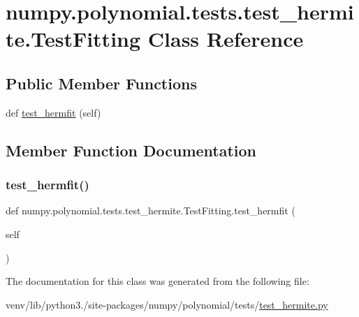 \hypertarget{classnumpy_1_1polynomial_1_1tests_1_1test__hermite_1_1TestFitting}{}\section{numpy.\+polynomial.\+tests.\+test\+\_\+hermite.\+Test\+Fitting Class Reference}
\label{classnumpy_1_1polynomial_1_1tests_1_1test__hermite_1_1TestFitting}
\subsection*{Public Member Functions}
\begin{DoxyCompactItemize}
\item 
def \hyperlink{classnumpy_1_1polynomial_1_1tests_1_1test__hermite_1_1TestFitting_a1f2b53111b48050c3ac6d70d0b3bd99f}{test\+\_\+hermfit} (self)
\end{DoxyCompactItemize}


\subsection{Member Function Documentation}
\mbox{\label{classnumpy_1_1polynomial_1_1tests_1_1test__hermite_1_1TestFitting_a1f2b53111b48050c3ac6d70d0b3bd99f}} 
\subsubsection{\texorpdfstring{test\+\_\+hermfit()}{test\_hermfit()}}
{\footnotesize\ttfamily def numpy.\+polynomial.\+tests.\+test\+\_\+hermite.\+Test\+Fitting.\+test\+\_\+hermfit (\begin{DoxyParamCaption}\item[{}]{self }\end{DoxyParamCaption})}



The documentation for this class was generated from the following file\+:\begin{DoxyCompactItemize}
\item 
venv/lib/python3./site-\/packages/numpy/polynomial/tests/\hyperlink{test__hermite_8py}{test\+\_\+hermite.\+py}\end{DoxyCompactItemize}
